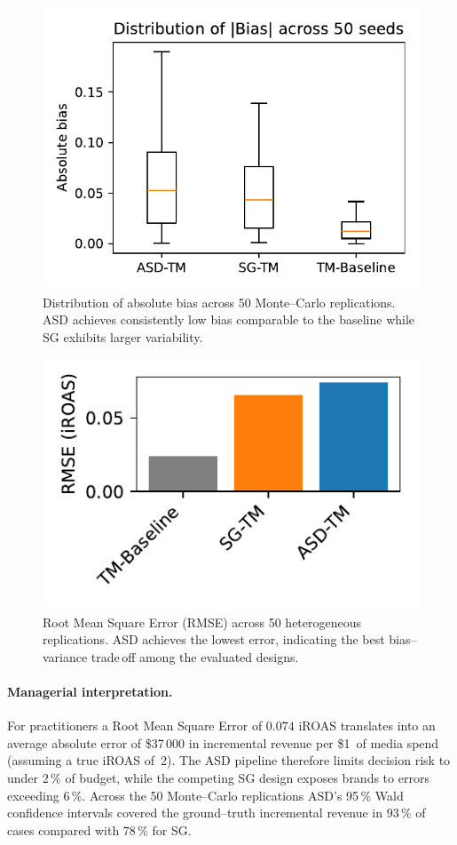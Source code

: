 \begin{figure}[htb!]
    \centering
    \includegraphics[width=0.7\linewidth]{paper_assets/abs_bias_boxplot.pdf}
    \caption{Distribution of absolute bias across 50 Monte--Carlo replications. ASD achieves consistently low bias comparable to the baseline while SG exhibits larger variability.}
    \label{fig:abs_bias_box}
\end{figure}

\begin{figure}[htb!]
    \centering
    \includegraphics[width=0.7\linewidth]{paper_assets/rmse_bar.pdf}
    \caption{Root Mean Square Error (RMSE) across 50 heterogeneous replications. ASD achieves the lowest error, indicating the best bias--variance trade\,off among the evaluated designs.}
    \label{fig:rmse_bar}
\end{figure}

\paragraph{Managerial interpretation.} For practitioners a Root Mean Square Error of $0.074$ iROAS translates into an average absolute error of \$37\,000 in incremental revenue per \$1\, of media spend (assuming a true iROAS of~2). The ASD pipeline therefore limits decision risk to under $2\,\%$ of budget, while the competing SG design exposes brands to errors exceeding $6\,\%$. Across the 50 Monte--Carlo replications ASD's 95\,\% Wald confidence intervals covered the ground--truth incremental revenue in $93\,\%$ of cases compared with $78\,\%$ for SG.





